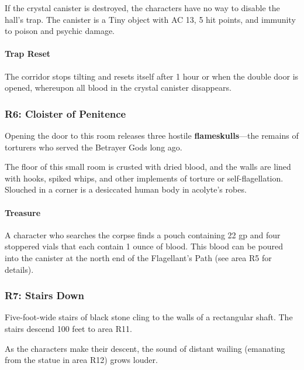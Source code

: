 \documentclass[a4paper, 11pt, bg=full, twocolumn, nooutline]{dndbook}
\begin{document}
If the crystal canister is destroyed, the characters have no way to disable the hall's trap. The canister is a Tiny object with AC 13, 5 hit points, and immunity to poison and psychic damage.

\paragraph{Trap Reset}

The corridor stops tilting and resets itself after 1 hour or when the double door is opened, whereupon all blood in the crystal canister disappears.

\subsubsection{R6: Cloister of Penitence}

Opening the door to this room releases three hostile \textbf{flameskulls}---the remains of torturers who served the Betrayer Gods long ago.


\begin{DndReadAloud}
The floor of this small room is crusted with dried blood, and the walls are lined with hooks, spiked whips, and other implements of torture or self-flagellation. Slouched in a corner is a desiccated human body in acolyte's robes.
\end{DndReadAloud}

\paragraph{Treasure}

A character who searches the corpse finds a pouch containing 22 gp and four stoppered vials that each contain 1 ounce of blood. This blood can be poured into the canister at the north end of the Flagellant's Path (see area R5 for details).

\subsubsection{R7: Stairs Down}

Five-foot-wide stairs of black stone cling to the walls of a rectangular shaft. The stairs descend 100 feet to area R11.

As the characters make their descent, the sound of distant wailing (emanating from the statue in area R12) grows louder.
\end{document}
